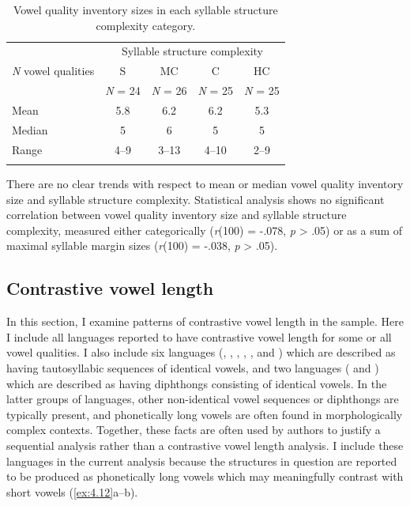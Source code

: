 \begin{table}
\begin{tabular}{lcccc}
\lsptoprule
 & \multicolumn{4}{c}{Syllable structure complexity}\\\cmidrule(lr){2-5}
\textit{N} vowel qualities & S & MC & C & HC\\
                           & \textit{N} = 24 & \textit{N} = 26    & \textit{N} = 25 & \textit{N} = 25\\\midrule
{Mean} & 5.8 & 6.2 & 6.2 & 5.3\\
{Median} & 5 & 6 & 5 & 5\\
{Range} & 4--9 & 3--13 & 4--10 & 2--9\\
\lspbottomrule
\end{tabular}
\caption{\label{tab:4.2}Vowel quality inventory sizes in each syllable structure complexity category.}
\end{table}

  There are no clear trends with respect to mean or median vowel quality inventory size and syllable structure complexity. Statistical analysis shows no significant correlation between vowel quality inventory size and syllable structure complexity, measured either categorically (\textit{r}(100) = -.078, \textit{p} > .05) or as a sum of maximal syllable margin sizes (\textit{r}(100) = -.038, \textit{p} > .05).

\subsection{Contrastive vowel length}\label{sec:4.3.2}

  In this section, I examine patterns of contrastive vowel length in the sample. Here I include all languages reported to have contrastive vowel length for some or all vowel qualities. I also include six languages (, , , , , and ) which are described as having tautosyllabic sequences of identical vowels, and two languages ( and ) which are described as having diphthongs consisting of identical vowels. In the latter groups of languages, other non-identical vowel sequences or diphthongs are typically present, and phonetically long vowels are often found in morphologically complex contexts. Together, these facts are often used by authors to justify a sequential analysis rather than a contrastive vowel length analysis. I include these languages in the current analysis because the structures in question are reported to be produced as phonetically long vowels which may meaningfully contrast with short vowels (\ref{ex:4.12}a--b).

